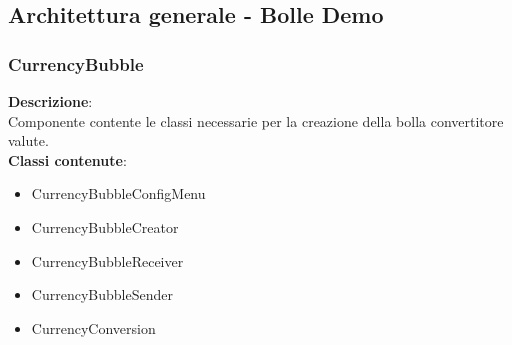 \clearpage \subsection{Architettura generale - Bolle Demo}
\subsubsection{CurrencyBubble}
   \FloatBarrier
\FloatBarrier
\textbf{Descrizione}:\\
 Componente contente le classi necessarie per la creazione della bolla convertitore valute. 
\\ \textbf{Classi contenute}:\\
\begin{itemize}
\item CurrencyBubbleConfigMenu
\item CurrencyBubbleCreator
\item CurrencyBubbleReceiver
\item CurrencyBubbleSender
\item CurrencyConversion
\end{itemize}


\clearpage

